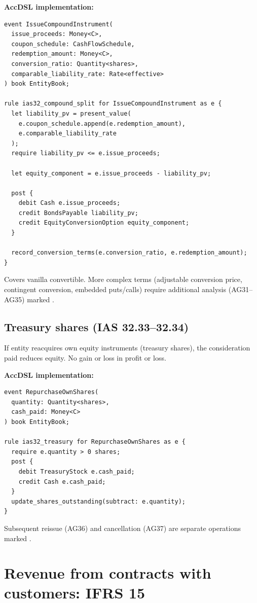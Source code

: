 \textbf{AccDSL implementation:}

\begin{lstlisting}
event IssueCompoundInstrument(
  issue_proceeds: Money<C>,
  coupon_schedule: CashFlowSchedule,
  redemption_amount: Money<C>,
  conversion_ratio: Quantity<shares>,
  comparable_liability_rate: Rate<effective>
) book EntityBook;

rule ias32_compound_split for IssueCompoundInstrument as e {
  let liability_pv = present_value(
    e.coupon_schedule.append(e.redemption_amount),
    e.comparable_liability_rate
  );
  require liability_pv <= e.issue_proceeds;

  let equity_component = e.issue_proceeds - liability_pv;

  post {
    debit Cash e.issue_proceeds;
    credit BondsPayable liability_pv;
    credit EquityConversionOption equity_component;
  }

  record_conversion_terms(e.conversion_ratio, e.redemption_amount);
}
\end{lstlisting}

 Covers vanilla convertible. More complex terms (adjustable
conversion price, contingent conversion, embedded puts/calls) require additional
analysis (AG31--AG35) marked .

\subsection{Treasury shares (IAS 32.33--32.34)}

If entity reacquires own equity instruments (treasury shares), the consideration
paid reduces equity. No gain or loss in profit or loss.

\textbf{AccDSL implementation:}

\begin{lstlisting}
event RepurchaseOwnShares(
  quantity: Quantity<shares>,
  cash_paid: Money<C>
) book EntityBook;

rule ias32_treasury for RepurchaseOwnShares as e {
  require e.quantity > 0 shares;
  post {
    debit TreasuryStock e.cash_paid;
    credit Cash e.cash_paid;
  }
  update_shares_outstanding(subtract: e.quantity);
}
\end{lstlisting}

 Subsequent reissue (AG36) and cancellation (AG37) are
separate operations marked .

\section{Revenue from contracts with customers: IFRS 15}

